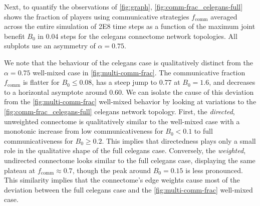 \documentclass[pdflatex,twocolumn,sn-nature,super]{sn-jnl}
\begin{document}
Next, to quantify the observations of \cref{fig:graph},
\cref{fig:comm-frac_celegans-full} shows the fraction of players
using communicative strategies $f_{\text{comm}}$ averaged across
the entire simulation of \num{2E8} time steps as a function
of the maximum joint benefit $B_0$ in \num{0.04} steps
for the \gls{celegans} connectome network topologies.
All subplots use an asymmetry of $\alpha=0.75$.

We note that the behaviour
of the  \gls{celegans} case
is qualitatively distinct
from the $\alpha = 0.75$ well-mixed case in \cref{fig:multi-comm-frac}.
The communicative fraction $f_{\text{comm}}$
is flatter for $B_0 \le 0.08$,
has a steep jump to \num{0.77} at $B_0 = 1.6$,
and decreases to a horizontal asymptote around \num{0.60}.
We can isolate the cause of this deviation
from the \cref{fig:multi-comm-frac} well-mixed
behavior by looking at variations to the \cref{fig:comm-frac_celegans-full}
\gls{celegans} network topology.
First, the 
\emph{directed}, unweighted connectome
is qualitatively similar to the
well-mixed case with a monotonic increase
from low communicativeness for $B_0 < 0.1$
to full communicativeness for $B_0 \ge 0.2$.
This implies that directedness
plays only a small role in the qualitative shape
of the  full \gls{celegans} case.
Conversely,
the 
\emph{weighted}, undirected connectome
looks similar to the 
full \gls{celegans} case,
displaying the same plateau at $f_{\text{comm}} \approx 0.7$,
though the peak around $B_0 = 0.15$ is less pronounced.
This similarity implies that the connectome's edge weights
cause most of the deviation
between the  full \gls{celegans}
case and the \cref{fig:multi-comm-frac} well-mixed case.
\end{document}
